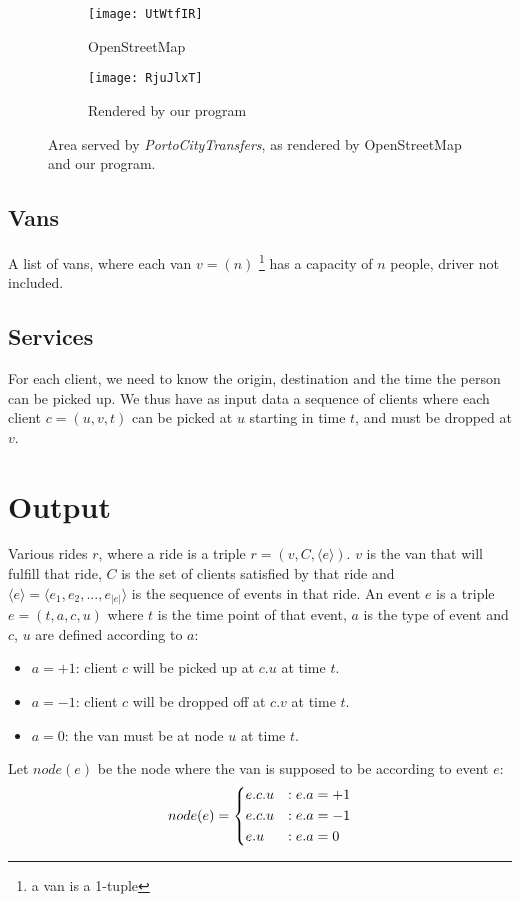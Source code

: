 \begin{figure}[H]
    \centering
    \begin{subfigure}{.45\textwidth}
        \centering
        \texttt{[image: UtWtfIR]}
        \caption{OpenStreetMap}
    \end{subfigure}
    \begin{subfigure}{.54\textwidth}
        \centering
        \texttt{[image: RjuJlxT]}
        \caption{Rendered by our program}
    \end{subfigure}
    \caption{Area served by \emph{PortoCityTransfers}, as rendered by OpenStreetMap and our program.}
\end{figure}

\subsection{Vans} \label{problem-formalization-input-vans}
A list of vans, where each van $v=(n)$ \footnote{a van is a 1-tuple} has a capacity of $n$ people, driver not included.
\subsection{Services} \label{problem-formalization-input-services}
For each client, we need to know the origin, destination and the time the person can be picked up.
We thus have as input data a sequence of clients where each client $c=(u, v, t)$ can be picked at $u$ starting in time $t$, and must be dropped at $v$.
\section{Output} \label{problem-formalization-output}
Various rides $r$, where a ride is a triple $r=(v, C, \langle e \rangle)$. $v$ is the van that will fulfill that ride, $C$ is the set of clients satisfied by that ride and $\langle e \rangle = \langle e_1, e_2,...,e_{|e|} \rangle$ is the sequence of events in that ride. An event $e$ is a triple $e=(t, a, c, u)$ where $t$ is the time point of that event, $a$ is the type of event and $c$, $u$ are defined according to $a$:
\pagebreak
\begin{itemize}
    \item $a=+1$: client $c$ will be picked up at $c.u$ at time $t$.
    \item $a=-1$: client $c$ will be dropped off at $c.v$ at time $t$.
    \item $a=0$: the van must be at node $u$ at time $t$.
\end{itemize}
Let $node(e)$ be the node where the van is supposed to be according to event $e$:
\begin{equation*}
    node(e)=\begin{dcases}
        e.c.u & : e.a = +1\\
        e.c.u & : e.a = -1\\
        e.u   & : e.a = 0
    \end{dcases}
\end{equation*}
